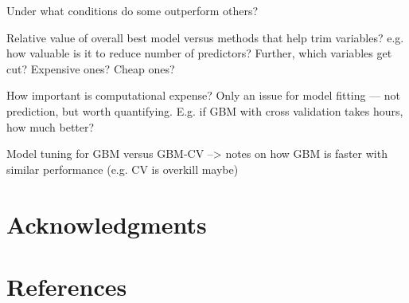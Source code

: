 \documentclass[english]{article}\usepackage[]{graphicx}\usepackage[]{color}
\numberwithin{equation}{section}
\numberwithin{figure}{section}
\renewcommand\[{\begin{equation}}
\renewcommand\]{\end{equation}}
\begin{document}
Under what conditions do some outperform others?

Relative value of overall best model versus methods that help trim
variables? e.g. how valuable is it to reduce number of predictors?
Further, which variables get cut? Expensive ones? Cheap ones?

How important is computational expense? Only an issue for model fitting
--- not prediction, but worth quantifying. E.g. if GBM with cross
validation takes hours, how much better? 

Model tuning for GBM versus GBM-CV --> notes on how GBM is faster
with similar performance (e.g. CV is overkill maybe)


\section{Acknowledgments}


\section{References}


\end{document}
